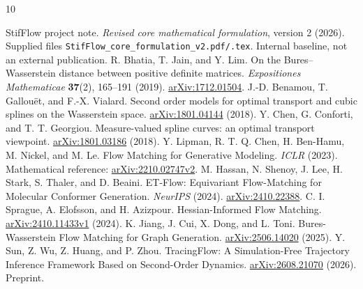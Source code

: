 \documentclass[11pt,letterpaper]{article}
\begin{document}
\begin{thebibliography}{10}\small\raggedright
{}
StifFlow project note. \emph{Revised core mathematical formulation}, version 2 (2026).
Supplied files \texttt{StifFlow\_core\_formulation\_v2.pdf/.tex}. Internal baseline, not an external publication.
R. Bhatia, T. Jain, and Y. Lim. On the Bures--Wasserstein distance between positive definite matrices.
\emph{Expositiones Mathematicae} \textbf{37}(2), 165--191 (2019).
\href{https://arxiv.org/abs/1712.01504}{arXiv:1712.01504}.
J.-D. Benamou, T. Gallou\"et, and F.-X. Vialard. Second order models for optimal transport and cubic splines on the Wasserstein space.
\href{https://arxiv.org/abs/1801.04144}{arXiv:1801.04144} (2018).
Y. Chen, G. Conforti, and T. T. Georgiou. Measure-valued spline curves: an optimal transport viewpoint.
\href{https://arxiv.org/abs/1801.03186}{arXiv:1801.03186} (2018).
Y. Lipman, R. T. Q. Chen, H. Ben-Hamu, M. Nickel, and M. Le. Flow Matching for Generative Modeling.
\emph{ICLR} (2023). Mathematical reference: \href{https://arxiv.org/abs/2210.02747v2}{arXiv:2210.02747v2}.
M. Hassan, N. Shenoy, J. Lee, H. Stark, S. Thaler, and D. Beaini. ET-Flow: Equivariant Flow-Matching for Molecular Conformer Generation.
\emph{NeurIPS} (2024). \href{https://arxiv.org/abs/2410.22388}{arXiv:2410.22388}.
C. I. Sprague, A. Elofsson, and H. Azizpour. Hessian-Informed Flow Matching.
\href{https://arxiv.org/abs/2410.11433v1}{arXiv:2410.11433v1} (2024).
K. Jiang, J. Cui, X. Dong, and L. Toni. Bures-Wasserstein Flow Matching for Graph Generation.
\href{https://arxiv.org/abs/2506.14020}{arXiv:2506.14020} (2025).
Y. Sun, Z. Wu, Z. Huang, and P. Zhou. TracingFlow: A Simulation-Free Trajectory Inference Framework Based on Second-Order Dynamics.
\href{https://arxiv.org/abs/2608.21070}{arXiv:2608.21070} (2026). Preprint.
\end{thebibliography}
\end{document}
